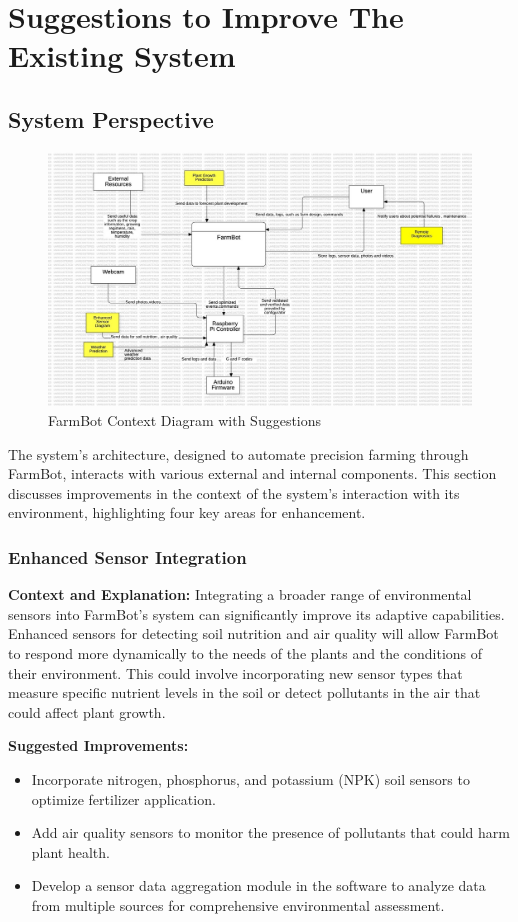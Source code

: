\chapter{Suggestions to Improve The Existing System} \label{suggestions}

\section{System Perspective}
\begin{figure}[H]
    \centering
\includegraphics[scale=0.37]{./Figures/farmbot_context_diagram_suggested.jpg}
\caption{FarmBot Context Diagram with Suggestions}
\end{figure}


The system's architecture, designed to automate precision farming through FarmBot, interacts with various external and internal components. This section discusses improvements in the context of the system's interaction with its environment, highlighting four key areas for enhancement.

\subsection{Enhanced Sensor Integration}
\textbf{Context and Explanation:} Integrating a broader range of environmental sensors into FarmBot's system can significantly improve its adaptive capabilities. Enhanced sensors for detecting soil nutrition and air quality will allow FarmBot to respond more dynamically to the needs of the plants and the conditions of their environment. This could involve incorporating new sensor types that measure specific nutrient levels in the soil or detect pollutants in the air that could affect plant growth.

\textbf{Suggested Improvements:}
\begin{itemize}
    \item Incorporate nitrogen, phosphorus, and potassium (NPK) soil sensors to optimize fertilizer application.
    \item Add air quality sensors to monitor the presence of pollutants that could harm plant health.
    \item Develop a sensor data aggregation module in the software to analyze data from multiple sources for comprehensive environmental assessment.
\end{itemize}

